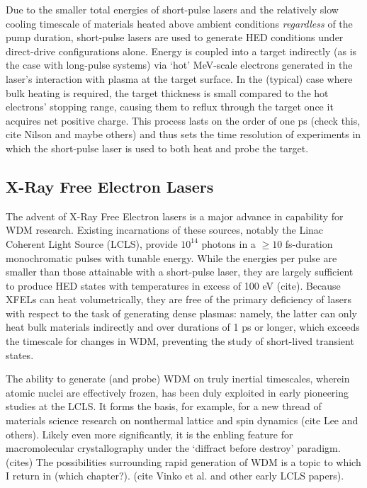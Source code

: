 \documentclass [11pt, proquest, article] {uwthesis}[2016/11/22]
\begin{document}
Due to the smaller total energies of short-pulse lasers and the relatively slow cooling timescale of materials heated above ambient conditions \textit{regardless} of the pump duration, short-pulse lasers are used to generate HED conditions under direct-drive configurations alone. Energy is coupled into a target indirectly (as is the case with long-pulse systems) via `hot' MeV-scale electrons generated in the laser's interaction with plasma at the target surface. In the (typical) case where bulk heating is required, the target thickness is small compared to the hot electrons' stopping range, causing them to reflux through the target once it acquires net positive charge. This process lasts on the order of one ps (check this, cite Nilson and maybe others) and thus sets the time resolution of experiments in which the short-pulse laser is used to both heat and probe the target.

\label{foobar}
\subsection{X-Ray Free Electron Lasers}
The advent of X-Ray Free Electron lasers is a major advance in capability for WDM research. Existing incarnations of these sources, notably the Linac Coherent Light Source (LCLS), provide $10^{14}$ photons in a $\geq 10$ fs-duration monochromatic pulses with tunable energy. While the energies per pulse are smaller than those attainable with a short-pulse laser, they are largely sufficient to produce HED states with temperatures in excess of 100 eV (cite). Because XFELs can heat volumetrically, they are free of the primary deficiency of lasers with respect to the task of generating dense plasmas: namely, the latter can only heat bulk materials indirectly and over durations of 1 ps or longer, which exceeds the timescale for changes in WDM, preventing the study of short-lived transient states.

The ability to generate (and probe) WDM on truly inertial timescales, wherein atomic nuclei are effectively frozen, has been duly exploited in early pioneering studies at the LCLS. It forms the basis, for example, for a new thread of materials science research on nonthermal lattice and spin dynamics (cite Lee and others). Likely even more significantly, it is the enbling feature for macromolecular crystallography under the `diffract before destroy' paradigm. (cites) The possibilities surrounding rapid generation of WDM is a topic to which I return in (which chapter?). (cite Vinko et al. and other early LCLS papers).
\end{document}
